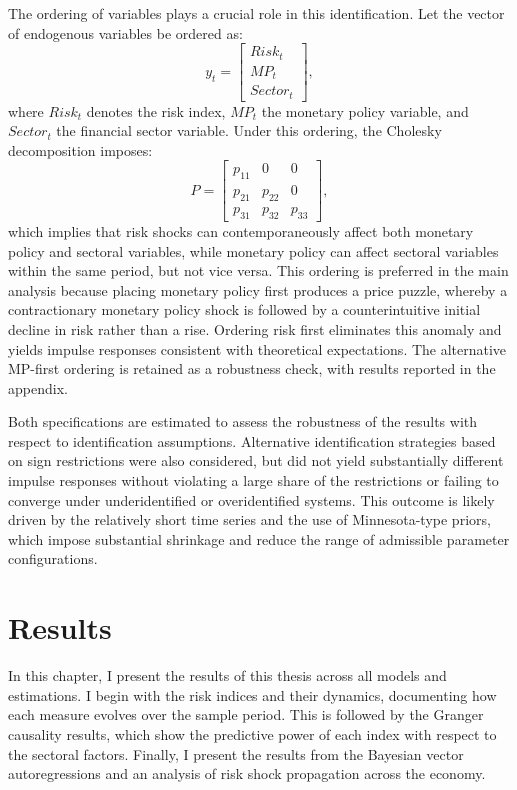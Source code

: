 \documentclass[12pt,a4paper]{report}\usepackage[a4paper, top=2.5cm, bottom=2.5cm, left=2.5cm, right=2.5cm]{geometry}
\begin{document}
The ordering of variables plays a crucial role in this identification. Let the vector 
of endogenous variables be ordered as:
\begin{equation}
y_t =
\begin{bmatrix}
Risk_t \\ MP_t \\ Sector_t
\end{bmatrix},
\end{equation}
where $Risk_t$ denotes the risk index, $MP_t$ the monetary policy variable, and 
$Sector_t$ the financial sector variable. Under this ordering, the Cholesky 
decomposition imposes:
\begin{equation}
P =
\begin{bmatrix}
p_{11} & 0      & 0      \\
p_{21} & p_{22} & 0      \\
p_{31} & p_{32} & p_{33}
\end{bmatrix},
\end{equation}
which implies that risk shocks can contemporaneously affect both monetary policy and 
sectoral variables, while monetary policy can affect sectoral variables within the 
same period, but not vice versa. This ordering is preferred in the main analysis 
because placing monetary policy first produces a price puzzle, whereby a 
contractionary monetary policy shock is followed by a counterintuitive initial 
decline in risk rather than a rise. Ordering risk first eliminates this anomaly and 
yields impulse responses consistent with theoretical expectations. The alternative 
MP-first ordering is retained as a robustness check, with results reported in the 
appendix.

Both specifications are estimated to assess the robustness of the results with respect 
to identification assumptions. Alternative identification strategies based on sign 
restrictions were also considered, but did not yield substantially different impulse 
responses without violating a large share of the restrictions or failing to converge 
under underidentified or overidentified systems. This outcome is likely driven by the 
relatively short time series and the use of Minnesota-type priors, which impose 
substantial shrinkage and reduce the range of admissible parameter configurations.

\chapter{Results}

In this chapter, I present the results of this thesis across all models and estimations. I begin with the risk indices and their dynamics, documenting how each measure evolves over the sample period. This is followed by the Granger causality results, which show the predictive power of each index with respect to the sectoral factors. Finally, I present the results from the Bayesian vector autoregressions and an analysis of risk shock propagation across the economy.
\end{document}
